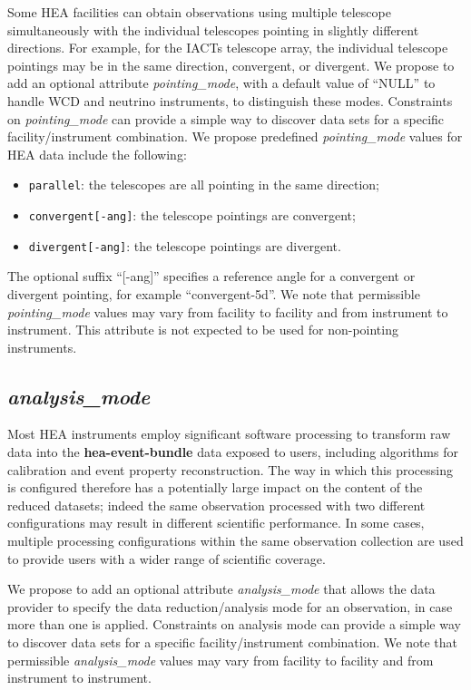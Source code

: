 \documentclass[11pt,a4paper]{ivoa}
\begin{document}
Some \gls{HEA} facilities can obtain observations using multiple telescope simultaneously with the individual telescopes pointing in slightly different directions.  For example, for the \glspl{IACT} telescope array, the individual telescope pointings may be in the same direction, convergent, or divergent.  We propose to add an optional attribute {\em pointing\_mode\/}, with a default value of ``NULL'' to handle \gls{WCD} and neutrino instruments, to distinguish these modes.  Constraints on {\em pointing\_mode\/} can provide a simple way to discover data sets for a specific facility/instrument combination.  We propose predefined {\em pointing\_mode\/} values for \gls{HEA} data include the following:
\begin{itemize}
	\item \texttt{parallel}: the telescopes are all pointing in the same direction;
	\item \texttt{convergent[-ang]}: the telescope pointings are convergent;
	\item \texttt{divergent[-ang]}: the telescope pointings are divergent.
\end{itemize}
The optional suffix ``[-ang]'' specifies a reference angle for a convergent or divergent pointing, for example ``convergent-5d''.  We note that permissible {\em pointing\_mode\/} values may vary from facility to facility and from instrument to instrument. This attribute is not expected to be used for non-pointing instruments.

\subsection{{\em analysis\_mode}}

Most \gls{HEA} instruments employ significant software processing to transform raw data into the {\bf hea-event-bundle} data exposed to users, including algorithms for calibration and event property reconstruction. The way in which this processing is configured therefore has a potentially large impact on the content of the reduced datasets; indeed the same observation processed with two different configurations may result in different scientific performance. In some cases, multiple processing configurations within the same observation collection are used to provide users with a wider range of scientific coverage.

We propose to add an optional attribute {\em analysis\_mode\/} that allows the data provider to specify the data reduction/analysis mode for an observation, in case more than one is applied. Constraints on analysis mode can provide a simple way to discover data sets for a specific facility/instrument combination. We note that permissible {\em analysis\_mode\/} values may vary from facility to facility and from instrument to instrument.
\end{document}
